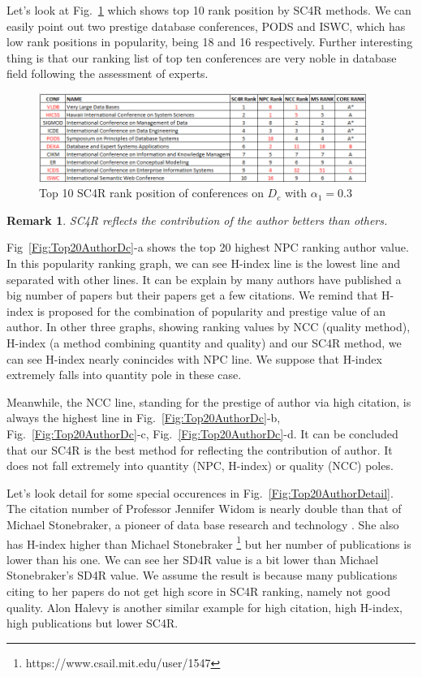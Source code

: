 \documentclass[10pt,leqno,twoside]{article}
\newtheorem{remark}{\indent Remark}[section]
\begin{document}
Let's look at Fig.~\ref{Fig:Top10ConfDc} which shows top 10 rank position by SC4R methods. We can easily point out two prestige database conferences, PODS and ISWC, which has low rank positions in popularity, being 18 and 16 respectively.
Further interesting thing is that our ranking list of top ten conferences are very noble in database field following the assessment of experts.
%
\begin{figure}
	\caption{Top 10 SC4R rank position of conferences on $D_c$ with $\alpha_1=0.3$}
	\label{Fig:Top10ConfDc}
    \centering
    \includegraphics[width=0.95\textwidth]{Top10Conf}
\end{figure}

\begin{remark}
SC4R reflects the contribution of the author betters than others. 
\end{remark}
Fig~\ref{Fig:Top20AuthorDc}-a shows the top 20 highest NPC ranking author value. In this popularity ranking graph, we can see H-index line is the lowest line and separated with other lines. It can be explain by many authors have published a big number of papers but their papers get a few citations. We remind that H-index is proposed for the combination of popularity and prestige value of an author. In other three graphs, showing ranking values by NCC (quality method), H-index (a method combining quantity and quality) and our SC4R method, we can see H-index nearly conincides with NPC line. We suppose that H-index extremely falls into quantity pole in these case. 

Meanwhile, the NCC line, standing for the prestige of author via high citation, is always the highest line in Fig.~\ref{Fig:Top20AuthorDc}-b, Fig.~\ref{Fig:Top20AuthorDc}-c, Fig.~\ref{Fig:Top20AuthorDc}-d. It can be concluded that our SC4R is the best method for reflecting the contribution of author. It does not fall extremely into quantity (NPC, H-index) or quality (NCC) poles.

Let's look detail for some special occurences in Fig.~\ref{Fig:Top20AuthorDetail}. The citation number of Professor Jennifer Widom%
 is nearly double than that of Michael Stonebraker, a pioneer of data base research and technology %
. She also has H-index higher than Michael Stonebraker \footnote{https://www.csail.mit.edu/user/1547} but her number of publications is lower than his one. We can see her SD4R value is a bit lower than Michael Stonebraker's SD4R value. We assume the result is because many publications citing to her papers do not get high score in SC4R ranking, namely not good quality.
Alon Halevy is another similar example for high citation, high H-index, high publications but lower SC4R. %
\end{document}
